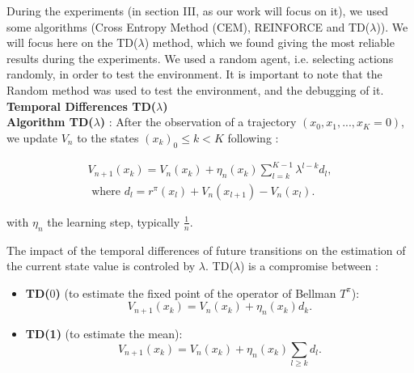 \documentclass[conference]{IEEEtran}
\begin{document}
During the experiments (in section III, as our work will focus on it), we used some algorithms (Cross Entropy Method (CEM), REINFORCE and TD($\lambda$)). 
We will focus here on the TD($\lambda$) method, which we found giving the most reliable results during the experiments. 
We used a random agent, i.e. selecting actions randomly, in order to test the environment.
It is important to note that the Random method was used to test the environment, and the debugging of it.
\\
\textbf{Temporal Differences TD($\lambda$)}
\\
	

\textbf{Algorithm TD($\lambda$)} \cite{sutton1988learning}: %
 After the observation of a trajectory $(x_0,x_1,...,x_K = 0)$, we update $V_n$	 to the states $(x_k)_0 \leqslant k<K$ following :



\begin{eqnarray*}
V_{n+1}(x_k) = V_n(x_k) + \eta_n(x_k)\sum_{l=k}^{K-1}\lambda^{l-k}d_l,\\ 
\mbox{ where } d_l = r^{\pi}(x_l) + V_n(x_{l+1})-V_n(x_l).
\end{eqnarray*}

with $\eta_n$ the learning step, typically $\frac{1}{n}$.

The impact of the temporal differences of future transitions on the estimation of the current state value is controled by $\lambda$. TD($\lambda$) is a compromise between : 
\begin{itemize}
 \item \textbf{TD($0$)} (to estimate the fixed point of the operator of Bellman $T^{\pi}$): 
 \begin{equation*}
  V_{n+1}(x_k) = V_n(x_k) + \eta_n(x_k)d_k. 
 \end{equation*}
 \item \textbf{TD(1)} (to estimate the mean): 
 \begin{equation*} 
 V_{n+1}(x_k) = V_n(x_k) + \eta_n(x_k)\sum_{l\geqslant k}d_l. 
 \end{equation*} 
\end{itemize}

\end{document}

